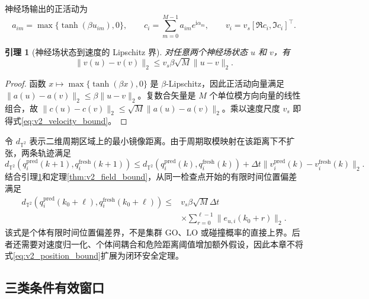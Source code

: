 \documentclass[UTF8,fontset=windows,11pt]{ctexart}
\newtheorem{lemma}[theorem]{引理}
\newcommand{\Ttwo}{\mathbb T^2}
\begin{document}
神经场输出的正活动为
\begin{equation}
 a_{im}=\max\{\tanh(\beta u_{im}),0\},
 \qquad
 c_i=\sum_{m=0}^{M-1}a_{im}e^{\mathrm i\alpha_m},
 \qquad
 v_i=v_s[\Re c_i,\Im c_i]^{\top}.
 \label{eq:v2_velocity_decode}
\end{equation}

\begin{lemma}[神经场状态到速度的 Lipschitz 界]
\label{lem:v2_velocity_bound}
对任意两个神经场状态 $u$ 和 $v$，有
\begin{equation}
 \|v(u)-v(v)\|_2
 \le v_s\beta\sqrt M\|u-v\|_2.
 \label{eq:v2_velocity_bound}
\end{equation}
\end{lemma}

\begin{proof}
函数 $x\mapsto\max\{\tanh(\beta x),0\}$ 是 $\beta$-Lipschitz，因此正活动向量满足
\(\|a(u)-a(v)\|_2\le\beta\|u-v\|_2\)。复数合矢量是 $M$ 个单位模方向向量的线性组合，故
\(\|c(u)-c(v)\|_2\le\sqrt M\|a(u)-a(v)\|_2\)。乘以速度尺度 $v_s$ 即得式\eqref{eq:v2_velocity_bound}。
\end{proof}

令 $d_{\Ttwo}$ 表示二维周期区域上的最小镜像距离。由于周期取模映射在该距离下不扩张，两条轨迹满足
\begin{equation}
 d_{\Ttwo}(q_i^{\mathrm{pred}}(k+1),q_i^{\mathrm{fresh}}(k+1))
 \le d_{\Ttwo}(q_i^{\mathrm{pred}}(k),q_i^{\mathrm{fresh}}(k))
 +\Delta t\|v_i^{\mathrm{pred}}(k)-v_i^{\mathrm{fresh}}(k)\|_2.
 \label{eq:v2_position_step}
\end{equation}
结合引理\ref{lem:v2_velocity_bound}和定理\ref{thm:v2_field_bound}，从同一检查点开始的有限时间位置偏差满足
\begin{equation}
 \begin{aligned}
 d_{\Ttwo}(q_i^{\mathrm{pred}}(k_0+\ell),q_i^{\mathrm{fresh}}(k_0+\ell))
 \le{}&v_s\beta\sqrt M\Delta t\\
 &\times\sum_{r=0}^{\ell-1}\|e_{u,i}(k_0+r)\|_2.
 \end{aligned}
 \label{eq:v2_position_bound}
\end{equation}
该式是个体有限时间位置偏差界，不是集群 GO、LO 或碰撞概率的直接上界。后者还需要对速度归一化、个体间耦合和危险距离阈值增加额外假设，因此本章不将式\eqref{eq:v2_position_bound}扩展为闭环安全定理。

\subsection{三类条件有效窗口}
\end{document}
